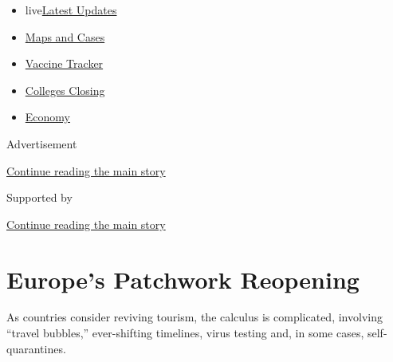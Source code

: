 \begin{itemize}
\tightlist
\item
  live\href{https://www.nytimes3xbfgragh.onion/2020/08/20/world/coronavirus-covid.html?name=styln-coronavirus-national\&region=TOP_BANNER\&variant=undefined\&block=storyline_menu_recirc\&action=click\&pgtype=Article\&impression_id=e4250100-e384-11ea-a632-91c271f5eaab}{Latest
  Updates}
\item
  \href{https://www.nytimes3xbfgragh.onion/interactive/2020/us/coronavirus-us-cases.html?name=styln-coronavirus-national\&region=TOP_BANNER\&variant=undefined\&block=storyline_menu_recirc\&action=click\&pgtype=Article\&impression_id=e4250101-e384-11ea-a632-91c271f5eaab}{Maps
  and Cases}
\item
  \href{https://www.nytimes3xbfgragh.onion/interactive/2020/science/coronavirus-vaccine-tracker.html?name=styln-coronavirus-national\&region=TOP_BANNER\&variant=undefined\&block=storyline_menu_recirc\&action=click\&pgtype=Article\&impression_id=e4250102-e384-11ea-a632-91c271f5eaab}{Vaccine
  Tracker}
\item
  \href{https://www.nytimes3xbfgragh.onion/2020/08/19/us/colleges-closing-covid.html?name=styln-coronavirus-national\&region=TOP_BANNER\&variant=undefined\&block=storyline_menu_recirc\&action=click\&pgtype=Article\&impression_id=e4250103-e384-11ea-a632-91c271f5eaab}{Colleges
  Closing}
\item
  \href{https://www.nytimes3xbfgragh.onion/live/2020/08/20/business/stock-market-today-coronavirus?name=styln-coronavirus-national\&region=TOP_BANNER\&variant=undefined\&block=storyline_menu_recirc\&action=click\&pgtype=Article\&impression_id=e4250104-e384-11ea-a632-91c271f5eaab}{Economy}
\end{itemize}

Advertisement

\protect\hyperlink{after-top}{Continue reading the main story}

Supported by

\protect\hyperlink{after-sponsor}{Continue reading the main story}

\hypertarget{europes-patchwork-reopening}{%
\section{Europe's Patchwork
Reopening}\label{europes-patchwork-reopening}}

As countries consider reviving tourism, the calculus is complicated,
involving ``travel bubbles,'' ever-shifting timelines, virus testing
and, in some cases, self-quarantines.


